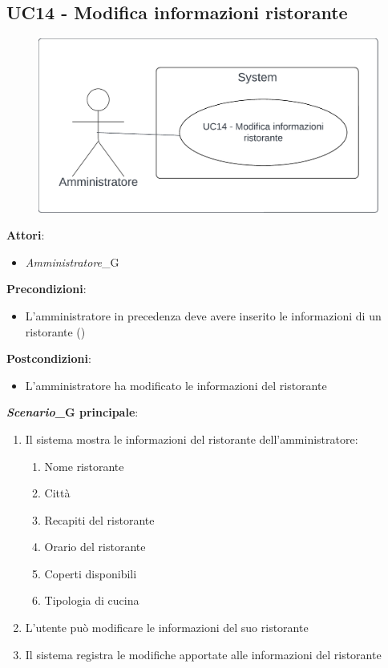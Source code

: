 \subsection{UC14 - Modifica informazioni ristorante} \label{usecase:14}
\begin{figure}[H]
    \centering
    \includegraphics[width=0.9\linewidth]{ucd/ucd14.png}
\end{figure}
\textbf{Attori}:
\begin{itemize}
    \item \textit{Amministratore}_G
\end{itemize}
\textbf{Precondizioni}:
\begin{itemize}
    \item L'amministratore in precedenza deve avere inserito le informazioni di un ristorante ()
\end{itemize}
\textbf{Postcondizioni}:
\begin{itemize}
    \item L'amministratore ha modificato le informazioni del ristorante
\end{itemize}
\textbf{\textit{Scenario}_G principale}:
\begin{enumerate}
    \item Il sistema mostra le informazioni del ristorante dell'amministratore:
    \begin{enumerate}
        \item Nome ristorante
        \item Città
        \item Recapiti del ristorante
        \item Orario del ristorante
        \item Coperti disponibili
        \item Tipologia di cucina
    \end{enumerate}
    \item L'utente può modificare le informazioni del suo ristorante
    \item Il sistema registra le modifiche apportate alle informazioni del ristorante
\end{enumerate}
\newpage